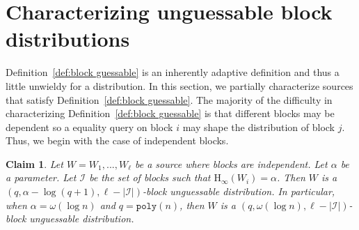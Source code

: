 \documentclass[11pt]{article}
\newcommand{\defref}[1]{\mbox{Definition~\ref{#1}}}
\newcommand{\poly}{\ensuremath{\mathtt{poly}}\xspace}
\newcommand{\Hoo}{\mathrm{H}_\infty}
\newtheorem{claim}[theorem]{Claim}
\begin{document}
\section{Characterizing unguessable block distributions}
\label{sec:characterize}

\defref{def:block guessable} is an inherently adaptive definition and thus a little unwieldy for a distribution.  In this section, we partially characterize sources that satisfy \defref{def:block guessable}.  
The majority of the difficulty in characterizing \defref{def:block guessable} is that different blocks may be dependent so a equality query on block $i$ may shape the distribution of block $j$.  Thus, we begin with the case of independent blocks.

\begin{claim}
\label{cl:independent high ent}
Let $W = W_1,..., W_\ell$ be a source where blocks are independent.  Let $\alpha$ be a parameter.  Let $\mathcal{I}$ be the set of blocks such that $\Hoo(W_i ) =\alpha $.  Then $W$ is a $(q, \alpha - \log (q+1), \ell - |\mathcal{I}|)$-block unguessable distribution.  In particular, when $\alpha = \omega(\log n)$ and $q = \poly(n)$, then $W$ is a $(q, \omega(\log n), \ell - |\mathcal{I}|)$-block unguessable distribution.
\end{claim}
\end{document}
